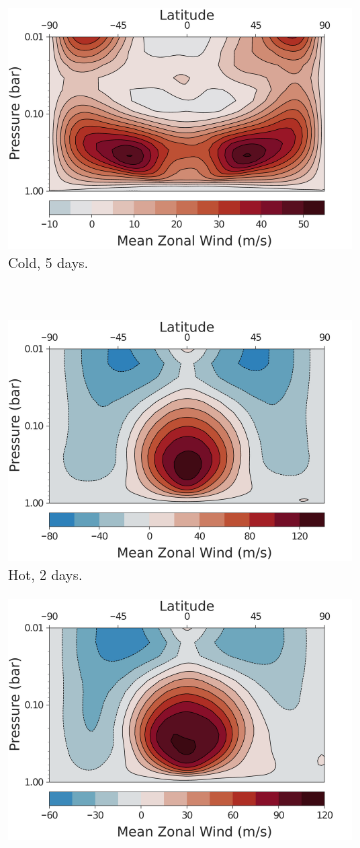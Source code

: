 \begin{figure}
\begin{subfigure}[b]{0.32\textwidth}
      \includegraphics[width=\textwidth]{figures/eqm-zonal-flow/wind-cold-5.pdf}
      \caption{Cold, 5 days.}
    \end{subfigure}
     \\
     \begin{subfigure}[b]{0.32\textwidth}
       \includegraphics[width=\textwidth]{figures/eqm-zonal-flow/wind-hot-2.pdf}
       \caption{Hot, 2 days.}
     \end{subfigure}
     \begin{subfigure}[b]{0.32\textwidth}
       \includegraphics[width=\textwidth]{figures/eqm-zonal-flow/wind-med-2.pdf}

\end{subfigure}
\end{figure}
